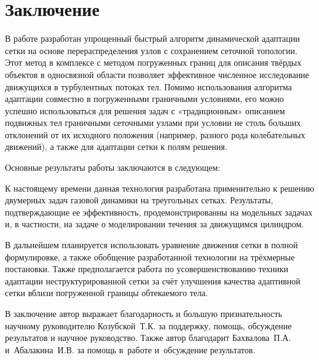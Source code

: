 \chapter*{Заключение}                       %
В работе разработан упрощенный быстрый алгоритм динамической адаптации сетки на основе перераспределения узлов с сохранением сеточной топологии. Этот метод в комплексе с методом погруженных границ для описания твёрдых объектов в односвязной области позволяет  эффективное численное исследование движущихся в турбулентных потоках тел.  Помимо использования алгоритма адаптации совместно в погруженными граничными условиями, его можно успешно использоваться для решения задач с «традиционным» описанием подвижных тел граничными сеточными узлами при условии не столь
больших отклонений от их исходного положения (например, разного рода 
колебательных движений), а также для адаптации сетки к полям решения.

Основные результаты работы заключаются в следующем:


К настоящему времени данная технология разработана применительно к решению двумерных задач газовой динамики на треугольных сетках. Результаты, подтверждающие ее эффективность, продемонстрированны на модельных задачах и, в частности, на задаче о моделировании течения за движущимся цилиндром.

В дальнейшем планируется использовать уравнение движения сетки в полной формулировке, а также обобщение разработанной технологии на трёхмерные постановки. Также предполагается работа по усовершенствованию техники адаптации неструктурированной сетки за счёт улучшения качества адаптивной сетки вблизи погруженной границы обтекаемого тела. 



В заключение автор
выражает благодарность и большую признательность научному руководителю
Козубской~Т.\:К. за поддержку, помощь, обсуждение результатов и научное
руководство. Также автор благодарит Бахвалова~П.\:А. и~Абалакина~И.\:В.
за помощь в~работе и~обсуждение результатов.
